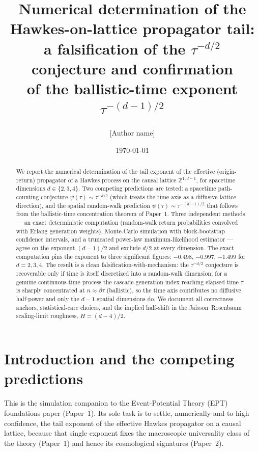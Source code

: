\documentclass[11pt,a4paper]{article}
\title{Numerical determination of the Hawkes-on-lattice propagator tail:\\
a falsification of the $\tau^{-d/2}$ conjecture and confirmation\\
of the ballistic-time exponent $\tau^{-(d-1)/2}$}
\author{[Author name]\\ [Affiliation]}
\date{\today}
\begin{document}
\maketitle

\begin{abstract}
We report the numerical determination of the tail exponent of the effective (origin-return) propagator of a Hawkes process on the causal lattice $\mathbb{Z}^{1,d-1}$, for spacetime dimensions $d\in\{2,3,4\}$. Two competing predictions are tested: a spacetime path-counting conjecture $\psi(\tau)\sim\tau^{-d/2}$ (which treats the time axis as a diffusive lattice direction), and the spatial random-walk prediction $\psi(\tau)\sim\tau^{-(d-1)/2}$ that follows from the ballistic-time concentration theorem of Paper~1. Three independent methods --- an exact deterministic computation (random-walk return probabilities convolved with Erlang generation weights), Monte-Carlo simulation with block-bootstrap confidence intervals, and a truncated power-law maximum-likelihood estimator --- agree on the exponent $(d-1)/2$ and exclude $d/2$ at every dimension. The exact computation pins the exponent to three significant figures: $-0.498$, $-0.997$, $-1.499$ for $d=2,3,4$. The result is a clean falsification-with-mechanism: the $\tau^{-d/2}$ conjecture is recoverable only if time is itself discretized into a random-walk dimension; for a genuine continuous-time process the cascade-generation index reaching elapsed time $\tau$ is sharply concentrated at $n\approx\beta\tau$ (ballistic), so the time axis contributes no diffusive half-power and only the $d-1$ spatial dimensions do. We document all correctness anchors, statistical-care choices, and the implied half-shift in the Jaisson--Rosenbaum scaling-limit roughness, $H=(d-4)/2$.
\end{abstract}

\section{Introduction and the competing predictions}

This is the simulation companion to the Event-Potential Theory (EPT) foundations paper (Paper~1). Its sole task is to settle, numerically and to high confidence, the tail exponent of the effective Hawkes propagator on a causal lattice, because that single exponent fixes the macroscopic universality class of the theory (Paper~1) and hence its cosmological signatures (Paper~2).
\end{document}
